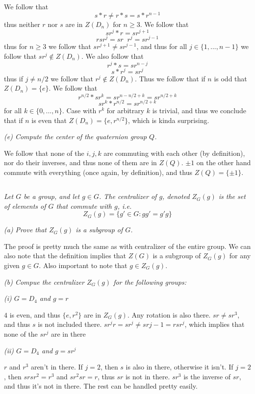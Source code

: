 \documentclass[11pt,oneside,titlepage]{book}
\DeclareMathOperator \inv {^{-1}}
\newcommand{\set}[1]{\{ #1 \}}
\begin{document}
We follow that
$$s * r \neq r * s = s * r^{n - 1}$$
thus neither $r$ nor $s$ are in $Z(D_n)$ for $n \geq 3$. We follow
that
$$sr^j * r = sr^{j + 1}$$
$$rsr^j = s r\inv r^j = sr^{j - 1}$$
thus for $n \geq 3$ we follow that $sr^{j + 1} \neq sr^{j - 1}$, and
thus for all $j \in \set{1, ..., n - 1}$ we follow that $sr^j \notin
Z(D_n)$.
We also follow that
$$r^j * s = sr^{n - j}$$
$$s * r^{j} = sr^{j}$$
thus if $j \neq n/2$ we follow that $r^j \notin Z(D_n)$. Thus we
follow that if $n$ is odd that $Z(D_n) = \set{e}$. We follow that
$$r^{n/2} * s r^k = sr^{n - n/2 + k} = sr^{n/2 + k}$$
$$s r^k * r^{n/2} = sr^{n/2 + k}$$
for all $k \in \set{0, ..., n}$. Case with $r^k$ for arbitrary $k$ is
trivial, and thus we conclude that if $n$ is even that $Z(D_n) =
\set{e, r^{n/2}}$, which is kinda surprising.

\textit{(e) Compute the center of the quaternion group $Q$.}

We follow that none of the $i, j, k$ are commuting with each other (by
definition), nor do their inverses, and thus none of them are in
$Z(Q)$. $\pm 1$ on the other hand commute with everything (once again,
by definition), and thus $Z(Q) = \set{\pm 1}$.

\subsection{}

\textit{Let $G$ be a group, and let $g \in G$. The centralizer of $g$,
  denoted $Z_G(g)$ is the set of elements of $G$ that commute with $g$,
  i.e.
  $$Z_G(g) = \set{g' \in G: gg' = g'g}$$
}

\textit{(a) Prove that $Z_G(g)$ is a subgroup of $G$.}

The proof is pretty much the same as with centralizer of the entire
group. We can also note that the definition implies that $Z(G)$ is a
subgroup of $Z_G(g)$ for any given $g \in G$. Also important to note
that $g \in Z_G(g)$.

\textit{(b) Compue the centralizer $Z_G(g)$ for the following groups:}

\textit{(i) $G = D_4$ and $g = r$}

$4$ is even, and thus $\set{e, r^2}$ are in $Z_G(g)$. Any rotation is
also there.  $sr \neq sr^3$, and thus $s$ is not included there. $sr^j
r = sr^j \neq sr{j - 1} = r sr^j$, which implies that none of the
$sr^j$ are in there

\textit{(ii) $G = D_4$ and $g = sr^j$}

$r$ and $r^3$ aren't in there. If $j = 2$, then $s$ is also in there,
otherwise it isn't.  If $j = 2$, then $sr sr^2 = r^{3}$ and $sr^2 sr =
r$, thus $sr$ is not in there.  $sr^3$ is the inverse of $sr$, and
thus it's not in there. The rest can be handled pretty easily.
\end{document}
